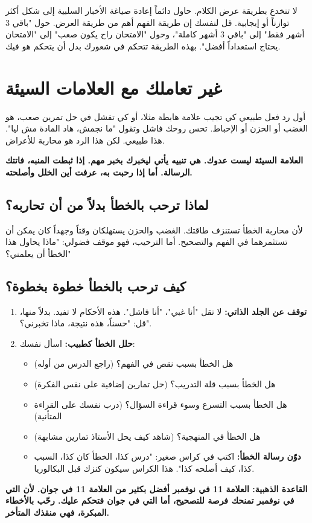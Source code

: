 \documentclass[12pt,a4paper]{book}
\newcommand{\importantAr}[1]{%
	\begin{important}
		\bfseries #1
	\end{important}
}
\begin{document}
		لا تنخدع بطريقة عرض الكلام. حاول دائماً إعادة صياغة الأخبار السلبية إلى شكل أكثر توازناً أو إيجابية. قل لنفسك إن طريقة الفهم أهم من طريقة العرض. حول "باقي 3 أشهر فقط" إلى "باقي 3 أشهر كاملة"، وحول "الامتحان راح يكون صعب" إلى "الامتحان يحتاج استعداداً أفضل". بهذه الطريقة تتحكم في شعورك بدل أن يتحكم هو فيك.

	\section{غير تعاملك مع العلامات السيئة}
	\label{sec:welcome-symptoms}
	
	أول رد فعل طبيعي كي تجيب علامة هابطة مثلا، أو كي تفشل في حل تمرين صعب، هو الغضب أو الحزن أو الإحباط. تحس روحك فاشل وتقول "ما نجمش، هاد المادة مش ليا". هذا طبيعي. لكن هذا الرد هو محاربة للأعراض.
	
	\importantAr{العلامة السيئة ليست عدوك. هي تنبيه يأتي ليخبرك بخبر مهم. إذا ثبطت المنبه، فاتتك الرسالة. أما إذا رحبت به، عرفت أين الخلل وأصلحته.}
	
	\subsection{لماذا ترحب بالخطأ بدلاً من أن تحاربه؟}
	
	لأن محاربة الخطأ تستنزف طاقتك. الغضب والحزن يستهلكان وقتاً وجهداً كان يمكن أن تستثمرهما في الفهم والتصحيح. أما الترحيب، فهو موقف فضولي: "ماذا يحاول هذا الخطأ أن يعلمني؟"
	\subsection{كيف ترحب بالخطأ خطوة بخطوة؟}
	
	\begin{enumerate}
		\item \textbf{توقف عن الجلد الذاتي:} لا تقل "أنا غبي"، "أنا فاشل". هذه الأحكام لا تفيد. بدلاً منها، قل: "حسناً، هذه نتيجة، ماذا تخبرني؟".
		
		\item \textbf{حلل الخطأ كطبيب:} اسأل نفسك:
		\begin{itemize}
			\item هل الخطأ بسبب نقص في الفهم؟ (راجع الدرس من أوله)
			\item هل الخطأ بسبب قلة التدريب؟ (حل تمارين إضافية على نفس الفكرة)
			\item هل الخطأ بسبب التسرع وسوء قراءة السؤال؟ (درب نفسك على القراءة المتأنية)
			\item هل الخطأ في المنهجية؟ (شاهد كيف يحل الأستاذ تمارين مشابهة)
			\item \textbf{دوّن رسالة الخطأ:} اكتب في كراس صغير: "درس كذا، الخطأ كان كذا، السبب كذا، كيف أصلحه كذا". هذا الكراس سيكون كنزك قبل البكالوريا.
		\end{itemize}
	\end{enumerate}
	\importantAr{القاعدة الذهبية: العلامة 11 في نوفمبر أفضل بكثير من العلامة 11 في جوان. لأن التي في نوفمبر تمنحك فرصة للتصحيح، أما التي في جوان فتحكم عليك. رحّب بالأخطاء المبكرة، فهي منقذك المتأخر.}
	
\end{document}
